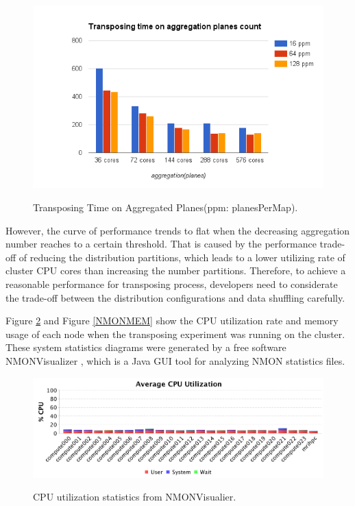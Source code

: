 \begin{figure}[h]
\centering
\includegraphics[scale=0.7]{figures/PerfTestAgg.png}\\
\caption{Transposing Time on Aggregated Planes(ppm: planesPerMap).}\label{PerfTestAgg}
\end{figure}

However, the curve of performance trends to flat when the decreasing aggregation number reaches to a certain threshold. That is caused by the performance trade-off of reducing the distribution partitions, which leads to a lower utilizing rate of cluster CPU cores than increasing the number partitions. Therefore, to achieve a reasonable performance for transposing process, developers need to considerate the trade-off between the distribution configurations and data shuffling carefully. 

Figure \ref{NMONCPU} and Figure \ref{NMONMEM} show the CPU utilization rate and memory usage of each node when the transposing experiment was running on the cluster. These system statistics diagrams were generated by a free software NMONVisualizer \cite{NMONVisualizer}, which is a Java GUI tool for analyzing NMON statistics files.

\begin{figure}[h]
\centering
\includegraphics[scale=0.55]{figures/NMONCpu.png}\\
\caption{CPU utilization statistics from NMONVisualier.}\label{NMONCPU}
\end{figure}

